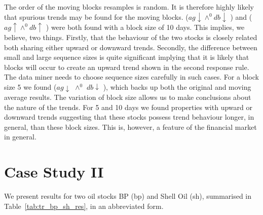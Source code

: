 The order of the moving blocks resamples is random. It is therefore
highly likely that spurious trends may be found for the moving blocks.
 ($ag \downarrow \wedge^{0} db \downarrow$ ) and
\linebreak {}
($ag \uparrow \wedge^{0} db \uparrow$ ) were both found with a block size
of 10 days. This implies, we believe, two things. Firstly, that the
behaviour of the two stocks is closely related both sharing either
upward or downward trends. Secondly, the difference between small and
large sequence sizes is quite significant implying that it is likely
that blocks will occur to create an upward trend shown in the second
response rule. The data miner needs to choose sequence sizes carefully
in such cases. For a block size 5 we found  ($ ag \downarrow$
$\wedge^0$ $ db \downarrow$ ), which backs up both the original and moving
average results. The variation of block size allows us to make
conclusions about the nature of the trends. For 5 and 10 days we found
properties with upward or downward trends suggesting that these stocks
possess trend behaviour longer, in general, than these block
sizes. This is, however, a feature of the financial market in general.


\section{Case Study II}\label{sec:tr_case2}

We present results for two oil stocks BP (bp) and Shell Oil (sh),
summarised in Table~\ref{tab:tr_bp_sh_res}, in an abbreviated form.

